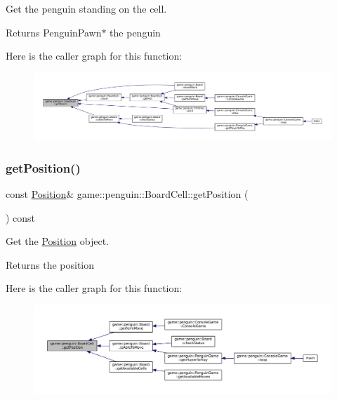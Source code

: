 Get the penguin standing on the cell. 

\begin{DoxyReturn}{Returns}
Penguin\+Pawn$\ast$ the penguin 
\end{DoxyReturn}
Here is the caller graph for this function\+:
\nopagebreak
\begin{figure}[H]
\begin{center}
\leavevmode
\includegraphics[width=350pt]{classgame_1_1penguin_1_1_board_cell_a011487b961b356a891144edcccc1473f_icgraph}
\end{center}
\end{figure}
\mbox{\label{classgame_1_1penguin_1_1_board_cell_a802b2f75d1e3136146625266f6a2c03a}} 
\subsubsection{\texorpdfstring{get\+Position()}{getPosition()}}
{\footnotesize\ttfamily const \hyperlink{structgame_1_1_position}{Position}\& game\+::penguin\+::\+Board\+Cell\+::get\+Position (\begin{DoxyParamCaption}{ }\end{DoxyParamCaption}) const\hspace{0.3cm}{\ttfamily [inline]}}



Get the \hyperlink{structgame_1_1_position}{Position} object. 

\begin{DoxyReturn}{Returns}
the position 
\end{DoxyReturn}
Here is the caller graph for this function\+:
\nopagebreak
\begin{figure}[H]
\begin{center}
\leavevmode
\includegraphics[width=350pt]{classgame_1_1penguin_1_1_board_cell_a802b2f75d1e3136146625266f6a2c03a_icgraph}
\end{center}
\end{figure}
\mbox{\label{classgame_1_1penguin_1_1_board_cell_a6a978b7e72ef20475771eb6e453e0a39}} 
